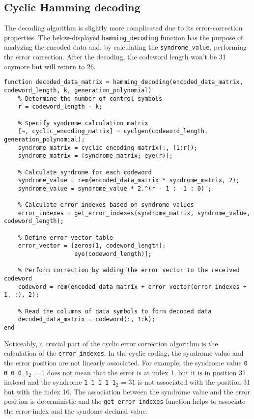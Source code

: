 \subsection{Cyclic Hamming decoding}\label{hamming-decoding}
The decoding algorithm is slightly more complicated due to its error-correction properties. The below-displayed \texttt{hamming\_decoding} function has the purpose of analyzing the encoded data and, by calculating the \texttt{syndrome\_value}, performing the error correction. After the decoding, the codeword length won't be 31 anymore but will return to 26.

\begin{lstlisting}
function decoded_data_matrix = hamming_decoding(encoded_data_matrix, codeword_length, k, generation_polynomial)  
    % Determine the number of control symbols
    r = codeword_length - k;
    
    % Specify syndrome calculation matrix
    [~, cyclic_encoding_matrix] = cyclgen(codeword_length, generation_polynomial);
    syndrome_matrix = cyclic_encoding_matrix(:, (1:r));
    syndrome_matrix = [syndrome_matrix; eye(r)];
    
    % Calculate syndrome for each codeword
    syndrome_value = rem(encoded_data_matrix * syndrome_matrix, 2);
    syndrome_value = syndrome_value * 2.^(r - 1 : -1 : 0)';
    
    % Calculate error indexes based on syndrome values
    error_indexes = get_error_indexes(syndrome_matrix, syndrome_value, codeword_length);
        
    % Define error vector table
    error_vector = [zeros(1, codeword_length);
                    eye(codeword_length)];
    
    % Perform correction by adding the error vector to the received codeword
    codeword = rem(encoded_data_matrix + error_vector(error_indexes + 1, :), 2);
    
    % Read the columns of data symbols to form decoded data
    decoded_data_matrix = codeword(:, 1:k);
end
\end{lstlisting}

\noindent Noticeably, a crucial part of the cyclic error correction algorithm is the calculation of the \texttt{error\_indexes}. In the cyclic coding, the syndrome value and the error position are not linearly associated. For example, the syndrome value \texttt{0 0 0 0 1}$_2$ = 1 does not mean that the error is at index 1, but it is in position 31 instead and the syndrome \texttt{1 1 1 1 1}$_2$ = 31 is not associated with the position 31 but with the index 16. The association between the syndrome value and the error position is deterministic and the \texttt{get\_error\_indexes} function helps to associate the error-index and the syndome decimal value.

